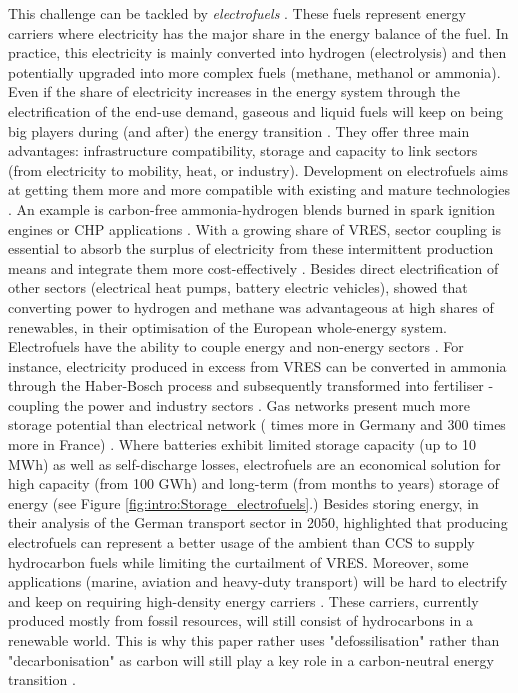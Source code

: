 This challenge can be tackled by \textit{electrofuels} \cite{rozzi2020}. These fuels represent energy carriers where electricity has the major share in the energy balance of the fuel. In practice, this electricity is mainly converted into hydrogen (\ie electrolysis) and then potentially upgraded into more complex fuels (\eg methane, methanol or ammonia). Even if the share of electricity increases in the energy system through the electrification of the end-use demand, gaseous and liquid fuels will keep on being big players during (and after) the energy transition \cite{Ahlgren2012}. They offer three main advantages: infrastructure compatibility, storage and capacity to link sectors (\ie from electricity to mobility, heat, or industry). Development on electrofuels aims at getting them more and more compatible with existing and mature technologies \cite{Ahlgren2012}. An example is carbon-free ammonia-hydrogen blends burned in spark ignition engines \cite{lhuillier2020experimental} or \gls{CHP} applications \cite{pochet202022}. With a growing share of \gls{VRES}, sector coupling is essential to absorb the surplus of electricity from these intermittent production means \cite{robinius2017linking} and integrate them more cost-effectively \cite{brown2018response, limpensECOS2021}. Besides direct electrification of other sectors (\eg electrical heat pumps, battery electric vehicles), \citet{brown2018synergies} showed that converting power to hydrogen and methane was advantageous at high shares of renewables, in their optimisation of the European whole-energy system. Electrofuels have the ability to couple energy and non-energy sectors \cite{Stancin2020}. For instance, electricity produced in excess from \gls{VRES} can be converted in ammonia through the Haber-Bosch process and subsequently transformed into fertiliser - coupling the power and industry sectors \cite{verleysen2020can}. Gas networks present much more storage potential than electrical network ( times more in Germany and 300 times more in France) \cite{Rosa2017}. Where batteries exhibit limited storage capacity (up to 10\,MWh) as well as self-discharge losses, electrofuels are an economical solution for high capacity (from 100 GWh) and long-term (\ie from months to years) storage of energy \cite{child2018role, dias2020energy} (see Figure \ref{fig:intro:Storage_electrofuels}.) Besides storing energy, in their analysis of the German transport sector in 2050, \citet{millinger2021electrofuels} highlighted that producing electrofuels can represent a better usage of the ambient  than \gls{CCS} to supply hydrocarbon fuels while limiting the curtailment of \gls{VRES}. Moreover, some applications (\eg marine, aviation and heavy-duty transport) will be hard to electrify and keep on requiring high-density energy carriers \cite{horvath2018techno, brynolf2018}. These carriers, currently produced mostly from fossil resources, will still consist of hydrocarbons in a renewable world. This is why this paper rather uses "defossilisation" rather than "decarbonisation" as carbon will still play a key role in a carbon-neutral energy transition \cite{mertens2020carbon}.

